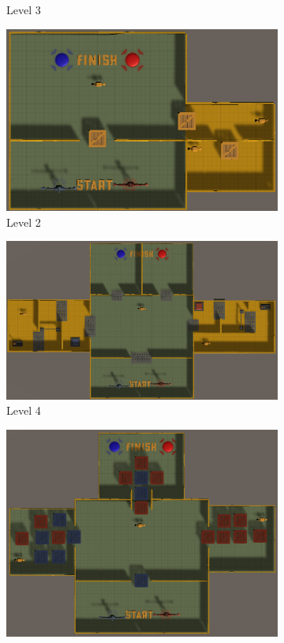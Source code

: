 \begin{figure}[h!]
\begin{subfigure}[b]{0.45\linewidth}
        \caption{Level 3}
        \label{fig:level 3}
      \end{subfigure}
    \begin{subfigure}[b]{0.45\linewidth}
        \includegraphics[width=\linewidth]{images/level_2.png}
        \caption{Level 2}
        \label{fig:level 2}
      \end{subfigure}
    \begin{subfigure}[b]{0.45\linewidth}
        \includegraphics[width=\linewidth]{images/level_4.png}
        \caption{Level 4}
        \label{fig:level 4}
      \end{subfigure}
    \begin{subfigure}[b]{0.45\linewidth}
        \includegraphics[width=\linewidth]{images/level_5.png}

\end{subfigure}
\end{figure}
